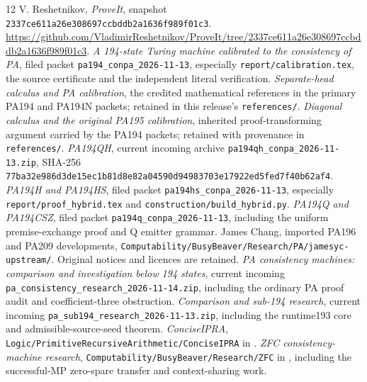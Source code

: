 \documentclass[11pt,letterpaper]{article}
\newcommand{\file}[1]{\texttt{\nolinkurl{#1}}}
\begin{document}
\clearpage
\begin{thebibliography}{12}
 V. Reshetnikov, \emph{ProveIt}, snapshot
\file{2337ce611a26e308697ccbddb2a1636f989f01c3}.
\url{https://github.com/VladimirReshetnikov/ProveIt/tree/2337ce611a26e308697ccbddb2a1636f989f01c3}.
 \emph{A 194-state Turing machine calibrated to the
consistency of PA}, filed packet \file{pa194_conpa_2026-11-13},
especially \file{report/calibration.tex}, the source certificate and
the independent literal verification.
 \emph{Separate-head calculus and PA calibration},
the credited mathematical references in the primary PA194 and PA194N
packets; retained in this release's \file{references/}.
 \emph{Diagonal calculus and the original PA195
calibration}, inherited proof-transforming argument carried by the
PA194 packets; retained with provenance in \file{references/}.
 \emph{PA194QH}, current incoming archive
\file{pa194qh_conpa_2026-11-13.zip}, SHA-256
\file{77ba32e986d3de15ec1b81d8e82a04590d94983703e17922ed5fed7f40b62af4}.
 \emph{PA194H and PA194HS}, filed packet
\file{pa194hs_conpa_2026-11-13}, especially
\file{report/proof_hybrid.tex} and \file{construction/build_hybrid.py}.
 \emph{PA194Q and PA194CSZ}, filed packet
\file{pa194q_conpa_2026-11-13}, including the uniform premise-exchange
proof and Q emitter grammar.
 James Chang, imported PA196 and PA209 developments,
\file{Computability/BusyBeaver/Research/PA/jamesyc-upstream/}.
Original notices and licences are retained.
 \emph{PA consistency machines: comparison and
investigation below 194 states}, current incoming
\file{pa_consistency_research_2026-11-14.zip}, including the ordinary
PA proof audit and coefficient-three obstruction.
 \emph{Comparison and sub-194 research}, current
incoming \file{pa_sub194_research_2026-11-13.zip}, including the
runtime193 core and admissible-source-seed theorem.
 \emph{ConciseIPRA},
\file{Logic/PrimitiveRecursiveArithmetic/ConciseIPRA} in \cite{repo}.
 \emph{ZFC consistency-machine research},
\file{Computability/BusyBeaver/Research/ZFC} in \cite{repo}, including
the successful-MP zero-spare transfer and context-sharing work.
\end{thebibliography}
\end{document}
